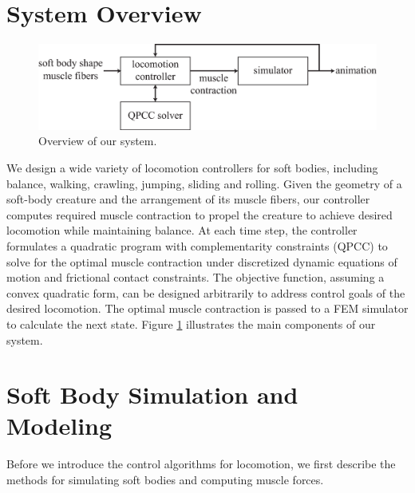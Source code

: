 \section{System Overview}

\begin{figure}[ht]
  \centering
  \includegraphics[width=5in]{figures/overview3}
  \caption{Overview of our system.}
  \label{fig:overview}
\end{figure}

We design a wide variety of locomotion controllers for soft bodies,
including balance, walking, crawling, jumping, sliding and rolling.
Given the geometry of a soft-body creature and the
arrangement of its muscle fibers, our controller computes required
muscle contraction to propel the creature to achieve desired
locomotion while maintaining balance. At each time step, the
controller formulates a quadratic program with complementarity
constraints (QPCC) to solve for the optimal muscle contraction under
discretized dynamic equations of motion and frictional contact
constraints. The objective function, assuming a convex quadratic form,
can be designed arbitrarily to address control goals of the desired
locomotion. The optimal muscle contraction is passed to a FEM
simulator to calculate the next state. Figure \ref{fig:overview}
illustrates the main components of our system.

\section{Soft Body Simulation and Modeling}
Before we introduce the control algorithms for locomotion, we first
describe the methods for simulating soft bodies and computing muscle
forces.

